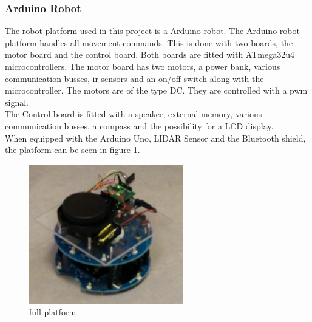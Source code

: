 \subsubsection{Arduino Robot}
The robot platform used in this project is a Arduino robot\cite{ArduinoRobot}. The Arduino robot platform handles all movement commands. This is done with two boards, the motor board and the control board. 
Both boards are fitted with ATmega32u4 microcontrollers. The motor board has two motors, a power bank, various communication busses, ir sensors and an on/off switch along with the microcontroller. 
The motors are of the type DC. They are controlled with a pwm signal.\\
The Control board is fitted with a speaker, external memory, various communication busses, a compass and the possibility for a LCD display.\\
When equipped with the Arduino Uno, LIDAR Sensor and the Bluetooth shield, the platform can be seen in figure \ref{fig:fullplatform}.
\begin{figure}[H]
\centering
\includegraphics[width=0.6\textwidth]{billeder/fullplatform}
\caption{full platform}
\label{fig:fullplatform}
\end{figure}


 
